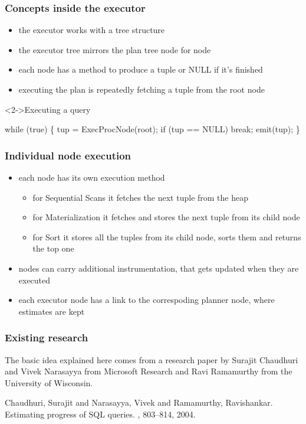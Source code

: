 \documentclass{beamer}
\begin{document}
\begin{frame}[fragile]
  \frametitle{Concepts inside the executor}

  \begin{itemize}
  \item the executor works with a tree structure
  \item the executor tree mirrors the plan tree node for node
  \item each node has a method to produce a tuple or NULL if it's finished
  \item executing the plan is repeatedly fetching a tuple from the root node
  \end{itemize}

  \begin{block}<2->{Executing a query}
    \begin{semiverbatim}
      while (true) \{
          tup = ExecProcNode(root);
          if (tup == NULL)
              break;
          emit(tup);
      \}
    \end{semiverbatim}
  \end{block}
\end{frame}

\begin{frame}
  \frametitle{Individual node execution}

  \begin{itemize}
  \item each node has its own execution method
    \begin{itemize}
    \item for Sequential Scans it fetches the next tuple from the heap
    \item for Materialization it fetches and stores the next tuple from its
      child node
    \item for Sort it stores \alert{all} the tuples from its child node, sorts
      them and returns the top one
    \end{itemize}
  \item nodes can carry additional instrumentation, that gets updated when they
    are executed
  \item each executor node has a link to the correspoding planner node, where
    estimates are kept
  \end{itemize}
\end{frame}

\begin{frame}
  \frametitle{Existing research}

  The basic idea explained here comes from a research paper by Surajit
  Chaudhuri and Vivek Narasayya from Microsoft Research and Ravi Ramamurthy
  from the University of Wisconsin.

  \bigskip

  \begin{thebibliography}{Chaudhuri 2004}

    Chaudhuri, Surajit and Narasayya, Vivek and Ramamurthy, Ravishankar.
    \newblock Estimating progress of SQL queries.
    , 803--814, 2004.

  \end{thebibliography}
\end{frame}
\end{document}
